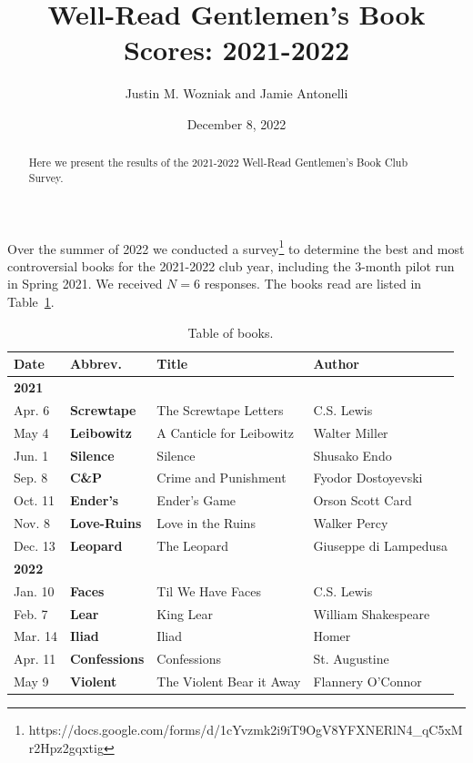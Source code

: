 \documentclass{article}
\newcommand{\B}[1]{\textbf{#1}}
\newcommand{\TABLE}[1]{Table~\ref{table:#1}}
\begin{document}
\title{Well-Read Gentlemen's Book Scores: 2021-2022}
\author{Justin M. Wozniak and Jamie Antonelli}
\date{December 8, 2022}

\onehalfspacing

\maketitle

\begin{abstract}
\noindent Here we present the results of the 2021-2022 Well-Read Gentlemen's Book Club Survey.
\end{abstract}

\noindent Over the summer of 2022 we conducted a survey\footnote{
{\sffamily https://docs.google.com/forms/d/1cYvzmk2i9iT9OgV8YFXNERlN4\_qC5xMr2Hpz2gqxtig}} to determine the best and most controversial books for the 2021-2022 club year, including the 3-month pilot run in Spring 2021.
We received $N=6$ responses.  The books read are listed in \TABLE{books}.

\begin{table}
  \begin{tabular}{llll}
    \B{Date} & \B{Abbrev.} & \B{Title} & \B{Author} \\ \hline \hline
    \B{2021} & & & \\
    Apr.  6  & \B{Screwtape} & The Screwtape Letters & C.S. Lewis \\
    May   4  & \B{Leibowitz} & A Canticle for Leibowitz & Walter Miller \\
    Jun.  1  & \B{Silence} & Silence & Shusako Endo \\
    Sep.  8  & \B{C\&P} & Crime and Punishment & Fyodor Dostoyevski \\
    Oct. 11  & \B{Ender's} &  Ender's Game & Orson Scott Card \\
    Nov.  8  & \B{Love-Ruins} & Love in the Ruins & Walker Percy \\
    Dec. 13  & \B{Leopard} & The Leopard & Giuseppe di Lampedusa \\
    \B{2022} & & & \\
    Jan. 10  & \B{Faces} & Til We Have Faces & C.S. Lewis \\
    Feb.  7  & \B{Lear} & King Lear & William Shakespeare \\
    Mar. 14  & \B{Iliad} & Iliad & Homer \\
    Apr. 11  & \B{Confessions} & Confessions & St. Augustine \\
    May   9  & \B{Violent} & The Violent Bear it Away & Flannery O'Connor \\
  \end{tabular}
  \caption{Table of books. \label{table:books}}
\end{table}
\end{document}
